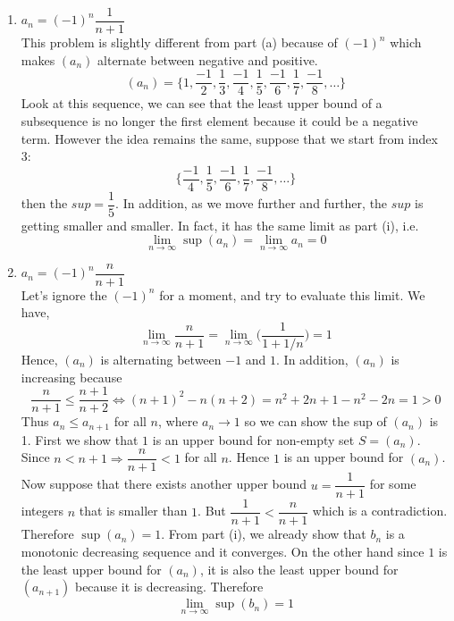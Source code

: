 \documentclass[10pt,letterpaper]{article}
\begin{document}
\begin{enumerate}[(i)]
\begin{enumerate}
		\item $a_n = (-1)^n \dfrac{1}{n + 1}$ \\
		This problem is slightly different from part (a) because of $(-1)^n$ which makes $(a_n)$
		alternate between negative and positive. 
		$$(a_n) = \bigg\{1, \dfrac{-1}{2}, \dfrac{1}{3}, \dfrac{-1}{4}, \dfrac{1}{5}, \dfrac{-1}{6}, 
		\dfrac{1}{7}, \dfrac{-1}{8},		
		\ldots 
		\bigg\}$$
		Look at this sequence, we can see that the least upper bound of a subsequence is no longer
		the first element because it could be a negative term. However the idea remains the same,
		suppose that we start from index 3:
		$$\bigg\{ \dfrac{-1}{4}, \dfrac{1}{5}, \dfrac{-1}{6}, 
		\dfrac{1}{7}, \dfrac{-1}{8}, \ldots \bigg\}$$
		then the $sup = \dfrac{1}{5}$. In addition, as we move further and further, the $sup$
		is getting smaller and smaller. In fact, it has the same limit as part (i), i.e.
		$$\displaystyle\lim_{n\to\infty} \sup(a_n) = \displaystyle\lim_{n\to\infty} a_n = 0$$ 	 
		
		\item $a_n = (-1)^n \dfrac{n}{n + 1}$ \\
		Let's ignore the $(-1)^n$ for a moment, and try to evaluate this limit. We have,
		$$
		\displaystyle\lim_{n\to\infty} \dfrac{n}{n + 1} = 
		\displaystyle\lim_{n\to\infty} \bigg(\dfrac{1}{1 + 1/n} \bigg) = 1
		$$
		Hence, $(a_n)$ is alternating between $-1$ and $1$. In addition, 
		$(a_n)$ is increasing because 
		$$\dfrac{n}{n+1} \leq \dfrac{n + 1}{n + 2} 
		\Leftrightarrow
		(n + 1)^2 - n(n + 2) = n^2 + 2n + 1 - n^2 - 2n = 1 > 0		
		$$
		Thus $a_n \leq a_{n+1}$ for all $n$, where $a_{n} \rightarrow 1$ so we can 
		show the sup of $(a_n)$ is 1. First we show that $1$ is an upper bound for non-empty
		set $S = (a_n)$. Since $n < n + 1 \Rightarrow \dfrac{n}{n + 1} < 1$ for all $n$. 
		Hence $1$ is an upper bound for $(a_n)$. Now suppose that there exists another 
		upper bound $u = \dfrac{1}{n + 1}$ for some integers $n$ that is smaller than $1$. 
		But $\dfrac{1}{n + 1} < \dfrac{n}{n + 1}$ which is a contradiction. Therefore
		$\sup(a_n) = 1$. From part (i), we already show that $b_n$ is a monotonic decreasing
		sequence and it converges. On the other hand since $1$ is the least upper bound for $(a_n)$, 
		it is also the least upper bound for $(a_{n+1})$ because it is decreasing. Therefore
		$$\displaystyle\lim_{n\to\infty} \sup(b_n) = 1$$
		\end{enumerate}
	\end{enumerate}
		
\end{document}
